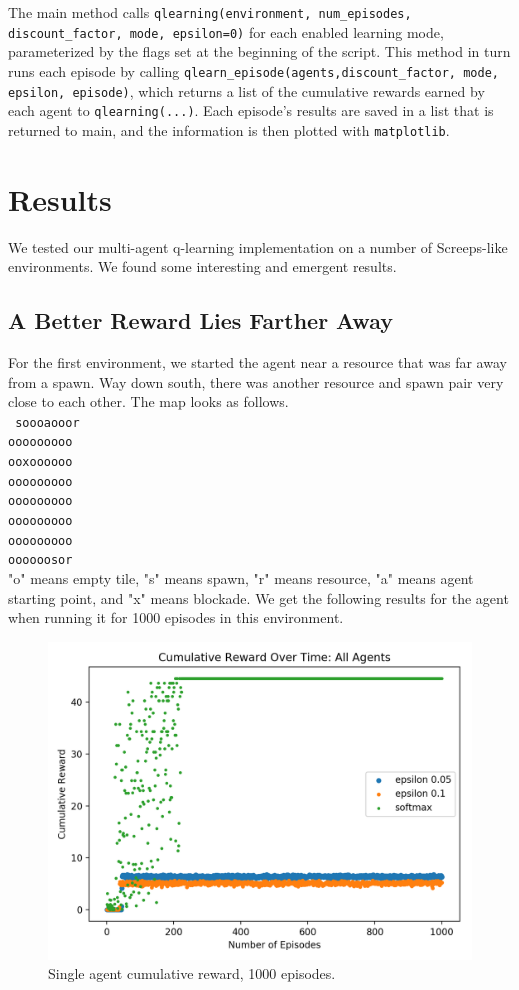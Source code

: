 \documentclass[11pt]{article}
\begin{document}
The main method calls \texttt{qlearning(environment, num_episodes, discount_factor, mode, epsilon=0)} for each enabled learning mode, parameterized by the flags set at the beginning of the script. This method in turn runs each episode by calling \texttt{qlearn_episode(agents,discount_factor, mode, epsilon, episode)}, which returns a list of the cumulative rewards earned by each agent to \texttt{qlearning(...)}. Each episode's results are saved in a list that is returned to main, and the information is then plotted with \texttt{matplotlib}.  


\section{Results}

We tested our multi-agent q-learning implementation on a number of Screeps-like environments. We found some interesting and emergent results.

\subsection{A Better Reward Lies Farther Away}

For the first environment, we started the agent near a resource that was far away from a spawn. Way down south, there was another resource and spawn pair very close to each other. The map looks as follows.\\
\texttt{
soooaooor\\
ooooooooo\\
ooxoooooo\\
ooooooooo\\
ooooooooo\\
ooooooooo\\
ooooooooo\\
oooooosor\\
}
"o" means empty tile, "s" means spawn, "r" means resource, "a" means agent starting point, and "x" means blockade. We get the following results for the agent when running it for 1000 episodes in this environment.\\

\begin{figure}[h]
  \centering
\includegraphics[width=.7\textwidth]{ai-env1.png}
\caption{Single agent cumulative reward, 1000 episodes.}
\end{figure}
\end{document}
